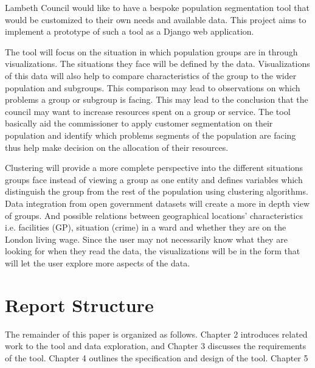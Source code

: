 \documentclass[11pt]{informatics-report}
\begin{document}
Lambeth Council would like to have a bespoke population segmentation tool that would be customized to their own needs and available data. This project aims to implement a prototype of such a tool as a Django web application.\par

The tool will focus on the situation in which population groups are in through visualizations. The situations they face will be defined by the data. Visualizations of this data will also help to compare characteristics of the group to the wider population and subgroups. This comparison may lead to observations on which problems a group or subgroup is facing. This may lead to the conclusion that the council may want to increase resources spent on a group or service. The tool basically aid the commissioner to apply customer segmentation on their population and identify which problems segments of the population are facing thus help make decision on the allocation of their resources.\par

Clustering will provide a more complete perspective into the different situations groups face instead of viewing a group as one entity and defines variables which distinguish the group from the rest of the population using clustering algorithms. Data integration from open government datasets will create a more in depth view of groups. And possible relations between geographical locations’ characteristics i.e. facilities (GP), situation (crime) in a ward and whether they are on the London living wage. Since the user may not necessarily know what they are looking for when they read the data, the visualizations will be in the form that will let the user explore more aspects of the data.\par

\section{Report Structure}
The remainder of this paper is organized as follows. Chapter 2 introduces related work to the tool and data exploration, and Chapter 3 discusses the requirements of the tool. Chapter 4 outlines the specification and design of the tool. Chapter 5












\appendix



\end{document}
